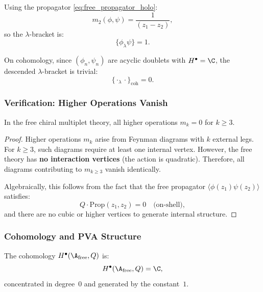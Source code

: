 Using the propagator \eqref{eq:free_propagator_holo}:
\begin{equation}
m_2(\phi, \psi) = \frac{1}{(z_1 - z_2)},
\end{equation}
so the $\lambda$-bracket is:
\begin{equation}
\{\phi_\lambda \psi\} = 1.
\end{equation}

On cohomology, since $(\phi_n, \psi_n)$ are acyclic doublets with $H^\bullet = \C$, the descended $\lambda$-bracket is trivial:
\begin{equation}
\{\cdot_\lambda \cdot\}_{\text{coh}} = 0.
\end{equation}

\subsubsection{Verification: Higher Operations Vanish}

\begin{proposition}[All $m_{k \geq 3} = 0$ for Free Theory]
In the free chiral multiplet theory, all higher operations $m_k = 0$ for $k \geq 3$.
\end{proposition}

\begin{proof}
Higher operations $m_k$ arise from Feynman diagrams with $k$ external legs. For $k \geq 3$, such diagrams require at least one internal vertex. However, the free theory has \textbf{no interaction vertices} (the action is quadratic). Therefore, all diagrams contributing to $m_{k \geq 3}$ vanish identically.

Algebraically, this follows from the fact that the free propagator $\langle \phi(z_1)\psi(z_2)\rangle$ satisfies:
\begin{equation}
Q \cdot \text{Prop}(z_1, z_2) = 0 \quad \text{(on-shell)},
\end{equation}
and there are no cubic or higher vertices to generate internal structure.
\end{proof}

\subsubsection{Cohomology and PVA Structure}

\begin{proposition}
The cohomology $H^\bullet(\A_{\text{free}}, Q)$ is:
\begin{equation}
H^\bullet(\A_{\text{free}}, Q) = \C,
\end{equation}
concentrated in degree~$0$ and generated by the constant~$1$.
\end{proposition}

